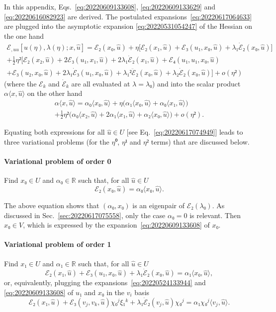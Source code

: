 \documentclass[12pt, final]{scrartcl}
\theoremstyle{definition}
\newcommand{\reals}{\mathbb{R}}
\begin{document}
In this appendix, Eqs.~\eqref{eq:20220609133608}, \eqref{eq:20220609133629} and
\eqref{eq:20220616082923} are derived. The postulated
expansions~\eqref{eq:20220617064633} are plugged into the asymptotic expansion
\eqref{eq:20220531054247} of the Hessian on the one hand
\begin{multline*}
  ℰ_{, uu} [u(η), λ(η); x, \hat{u}] = ℰ₂(x₀, \hat{u}) + η \bigl[ ℰ₂(x₁, \hat{u}) + ℰ₃(u₁, x₀, \hat{u}) + λ₁ \dot{ℰ}₂(x₀, \hat{u})\bigr]\\
  + \tfrac{1}{2} η² \bigl[ℰ₂(x₂, \hat{u}) + 2ℰ₃(u₁, x₁, \hat{u}) + 2 λ₁ \dot{ℰ}₂(x₁, \hat{u}) + ℰ₄(u₁, u₁, x₀, \hat{u})\\
  + ℰ₃(u₂, x₀, \hat{u}) + 2λ₁ \dot{ℰ}₃(u₁, x₀, \hat{u}) + λ₁² \ddot{ℰ}₂(x₀, \hat{u}) + λ₂ \dot{ℰ}₂(x₀, \hat{u}) \bigr] + o(η²)
\end{multline*}
(where the \(ℰ_k\) and \(\dot{ℰ}_k\) are all evaluated at \(λ=λ₀\)) and into the
scalar product \(α 〈 x, \hat{u} 〉\) on the other hand
\begin{multline*}
    α 〈 x, \hat{u} 〉 = α₀ 〈 x₀, \hat{u} 〉 + η \bigl(α₁ 〈 x₀, \hat{u} 〉 + α₀ 〈 x₁, \hat{u} 〉\bigr)\\
    + \tfrac{1}{2} η² \bigl(α₀ 〈 x₂, \hat{u} 〉 + 2 α₁ 〈 x₁, \hat{u} 〉 + α₂ 〈 x₀, \hat{u} 〉\bigr) + o(η²).
\end{multline*}

Equating both expressions for all \(\hat{u} ∈ U\) [see
Eq.~\eqref{eq:20220617074949}] leads to three variational problems (for the
\(η⁰\), \(η¹\) and \(η²\) terms) that are discussed below.

\paragraph{Variational problem of order 0} Find \(x₀∈U\) and \(α₀∈\reals\) such
that, for all \(\hat{u}∈U\)
\begin{equation*}
  ℰ₂(x₀, \hat{u}) = α₀ 〈 x₀, \hat{u} 〉.
\end{equation*}

The above equation shows that \((α₀, x₀)\) is an eigenpair of \(ℰ₂(λ₀)\). As
discussed in Sec.~\ref{sec:20220617075558}, only the case \(α₀ = 0\) is
relevant. Then \(x₀ ∈ V\), which is expressed by the
expansion~\eqref{eq:20220609133608} of \(x₀\).

\paragraph{Variational problem of order 1} Find \(x₁∈U\) and \(α₁∈\reals\) such
that, for all \(\hat{u}∈U\)
\begin{equation}
  \label{eq:20220609131953}
  ℰ₂(x₁, \hat{u}) + ℰ₃(u₁, x₀, \hat{u}) + λ₁ \dot{ℰ}₂(x₀, \hat{u}) = α₁ 〈 x₀, \hat{u} 〉,
\end{equation}
or, equivalently, plugging the expansions~\eqref{eq:20220524133944} and
\eqref{eq:20220609133608} of \(u₁\) and \(x₀\) in the \(v_i\) basis
\begin{equation}
  \label{eq:20220617080547}
  ℰ₂(x₁, \hat{u}) + ℰ₃(v_j, v_k, \hat{u}) χ₀^j ξ₁^k + λ₁ \dot{ℰ}₂(v_j, \hat{u}) χ₀^j = α₁ χ₀^j 〈 v_j, \hat{u} 〉.
\end{equation}
\end{document}

